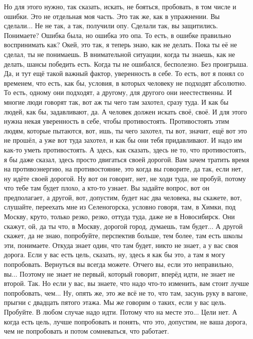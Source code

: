 Но для этого нужно, так сказать, искать, не бояться, пробовать, в том числе и ошибки.
Это не отдельная моя часть.
Это так же, как в упражнении.
Вы сделали...
Не не так, а так, получили опу.
Сделали так, вы защитились.
Понимаете?
Ошибка была, но ошибка это опа.
То есть, в ошибке правильно воспринимать как?
Окей, это так, я теперь знаю, как не делать.
Пока ты её не сделал, ты не понимаешь.
В внимательной ситуации, когда ты знаешь, как не делать, шансы победить есть.
Когда ты не ошибался, бесполезно.
Без проигрыша.
Да, и тут ещё такой важный фактор, уверенность в себе.
То есть, вот я понял со временем, что есть, как бы, условия, в которых человеку не подходят абсолютно.
То есть, одному они подходят, а другому, для другого они неестественны.
И многие люди говорят так, вот аж ты чего там захотел, сразу туда.
И как бы людей, как бы, задавливают, да.
А человек должен искать своё, своё.
И для этого нужна некая уверенность в себе, чтобы противостоять.
Противостоять этим людям, которые пытаются, вот, ишь, ты чего захотел, ты вот, значит, ещё вот это не прошёл, а уже вот туда захотел, и как бы они тебя придавливают.
И надо им как-то уметь противостоять.
А здесь, как сказать, здесь не то, что противостоять, я бы даже сказал, здесь просто двигаться своей дорогой.
Вам зачем тратить время на противоэнергию, на противостояние, это когда вы говорите, да так, если нет, ну идёте своей дорогой.
Ну вот он говорит, нет, не ходи туда, не пробуй, потому что тебе там будет плохо, а кто-то узнает.
Вы задайте вопрос, вот он предполагает, а другой, вот, допустим, будет нас два человека, вы скажете, вот, слушайте, переехать мне из Селеногорска, условно говоря, там, в Химки, под Москву, круто, только резко, резко, оттуда туда, даже не в Новосибирск.
Они скажут, ой, да ты что, в Москву, дорогой город, думаешь, там будет...
А другой скажет, да не знаю, попробуйте, перспектив больше, тем более, там есть школы эти, понимаете.
Откуда знает один, что там будет, никто не знает, а у вас своя дорога.
Если у вас есть цель, сказать, ну, здесь я как бы это, а там я могу попробовать.
Вернуться вы всегда можете.
Отчего вы, если это неправильно, вы...
Поэтому не знает не первый, который говорит, вперёд идти, не знает не второй.
Так.
Но если у вас, вы знаете, что надо что-то изменить, вам стоит лучше попробовать, чем...
Ну, опять же, это же всё не то, что там, засунь руку в вагоне, прыгни с двадцать пятого этажа.
Мы же говорим о таких, если у вас цель.
Пробуйте.
В любом случае надо идти.
Потому что на месте это...
Цели нет.
А когда есть цель, лучше попробовать и понять, что это, допустим, не ваша дорога, чем не попробовать и потом сомневаться, что работает.
